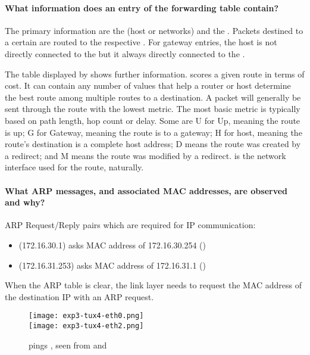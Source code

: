 \documentclass[compilation.tex]{subfiles}
\begin{document}
	\paragraph{What information does an entry of the forwarding table contain?}
	The primary information are the  (host or networks) and the . Packets destined to a certain  are routed to the respective . For gateway entries, the host is not directly connected to the  but it always directly connected to the .
	
	The table displayed by  shows further information.  scores a given route in terms of cost. It can contain any number of values that help a router or host determine the best route among multiple routes to a destination. A packet will generally be sent through the route with the lowest metric. The most basic metric is typically based on path length, hop count or delay. Some  are U for Up, meaning the route is up; G for Gateway, meaning the route is to a gateway; H for host, meaning the route's destination is a complete host address; D means the route was created by a redirect; and M means the route was modified by a redirect.  is the network interface used for the route, naturally.
	
	\paragraph{What ARP messages, and associated MAC addresses, are observed and why?}
	ARP Request/Reply pairs which are required for IP communication:
	\begin{itemize}[noitemsep,leftmargin=*,topsep=0pt]
		\item {} (172.16.30.1) asks MAC address of 172.16.30.254 ()
		\item {} (172.16.31.253) asks MAC address of 172.16.31.1 ()
	\end{itemize}
	When the ARP table is clear, the link layer needs to request the MAC address of the destination IP with an ARP request.
	
	\begin{figure}[hbt]
		\centering
		\texttt{[image: exp3-tux4-eth0.png]}\\
		\vspace*{.8\baselineskip}
		\texttt{[image: exp3-tux4-eth2.png]}
		\caption{ pings , seen from  and }
		\label{fig:exp3-tux4.png}
	\end{figure}
	
\end{document}
